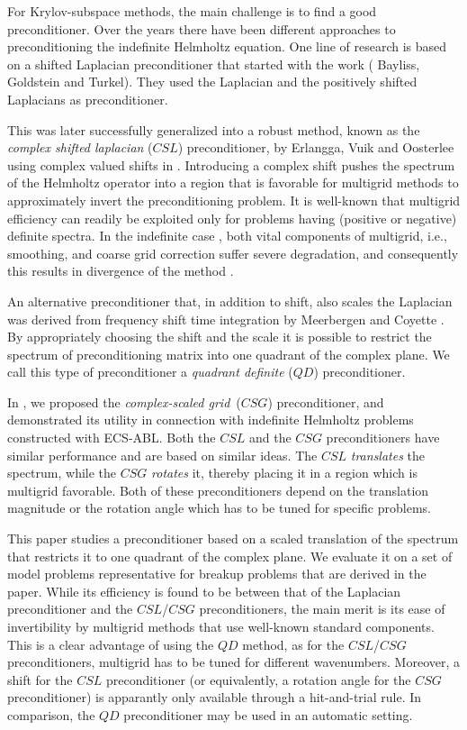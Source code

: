 \documentclass[mathpazo]{cicp}
\theoremstyle{definition}
\numberwithin{equation}{section}
\providecommand{\wv}{}
\providecommand{\hbz}{}
\begin{document}
For \hbz{Krylov-subspace methods, the main challenge is to} find a good preconditioner.
Over the years there have been different approaches to preconditioning the \hbz{indefinite} Helmholtz equation. One line of research is based on a shifted Laplacian preconditioner that started with the work \cite{Bayliss83, Bayliss85} ( Bayliss, Goldstein and Turkel).  
They used the Laplacian and the positively shifted Laplacians as preconditioner. 

This was later successfully generalized into a robust method, known as
the {\it complex shifted laplacian} ($CSL$) preconditioner, by Erlangga,
Vuik and Oosterlee using complex valued shifts in
\cite{Yogi04,Yogi06}. Introducing a complex shift pushes the spectrum
of the Helmholtz operator into a region \hbz{that is favorable} for multigrid methods \cite{Achi77,Stu82,Trot01} to
approximately invert the preconditioning problem. It is well-known that multigrid efficiency can readily be exploited \hbz{only} for problems having (positive or negative) definite \hbz{spectra}. In the indefinite case \cite{Trot01}, both vital components of multigrid, i.e., smoothing, and coarse grid correction suffer severe degradation, and consequently this results in
divergence of the method \cite{EEL01}.

An alternative preconditioner that, in addition to shift, also scales
the Laplacian was derived from frequency shift time integration by
Meerbergen and Coyette \cite{meerbergen2009}.  By appropriately
choosing the shift and the scale it is possible to restrict the
spectrum of preconditioning matrix into one quadrant of the complex
plane.  We call this type of preconditioner a {\it quadrant definite}
($QD$) preconditioner.

In \cite{reps2009}, we proposed the {\it complex-scaled grid}\, ($CSG$) preconditioner, 
and demonstrated its utility in connection with indefinite Helmholtz 
problems constructed with ECS-ABL. Both the $CSL$ and the $CSG$ preconditioners have similar performance 
and are based on similar ideas. The $CSL$ \textit{translates} the spectrum, while the $CSG$ \textit{rotates}
 it, \hbz{thereby placing it in a region which is multigrid favorable}. Both of these preconditioners depend on the 
translation magnitude or the rotation angle which has to be tuned for specific problems. 

This paper \wv{studies} a preconditioner based on a scaled translation
of the spectrum \wv{that} restricts it to one quadrant of the complex
plane. \wv{We evaluate it on a set of model problems representative for
breakup problems that are derived in the paper.}  \hbz{While its efficiency is found to be between that of the Laplacian
preconditioner and the $CSL$/$CSG$ preconditioners, the main merit is its ease of invertibility by multigrid methods that use well-known standard components. This is a clear advantage of using the $QD$ method, as for the $CSL$/$CSG$ preconditioners, multigrid has to be tuned for different wavenumbers. Moreover, a shift for the $CSL$ preconditioner (or equivalently, a rotation angle for the $CSG$ preconditioner) is apparantly only available through a hit-and-trial rule. In comparison, the $QD$ preconditioner may be used in an automatic setting.}
\end{document}
